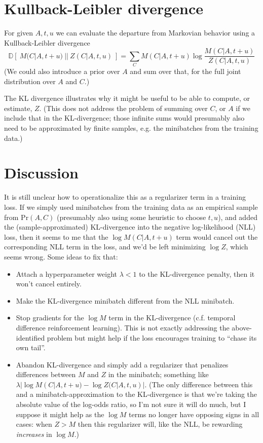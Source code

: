 \documentclass{article}
\newcommand\prob[1]{\mbox{Pr}\left( #1 \right)}
\newcommand\seclabel[1]{\label{sec:#1}}
\begin{document}
\section{Kullback-Leibler divergence}
\seclabel{KullbackLeibler}


For given $A,t,u$ we can evaluate the departure from Markovian behavior using a Kullback-Leibler divergence
\[
\mathbb{D}\left[\ M(C|A,t+u)\ ||\ Z(C|A,t,u)\ \right]
=
\sum_C M(C|A,t+u) \log
\frac{M(C|A,t+u)}{Z(C|A,t,u)}
\]
(We could also introduce a prior over $A$ and sum over that, for the full joint distribution over $A$ and $C$.)

The KL divergence illustrates why it might be useful to be able to compute, or estimate, $Z$.
(This does not address the problem of summing over $C$, or $A$ if we include that in the KL-divergence;
those infinite sums would presumably also need to be approximated by finite samples, e.g. the minibatches from the training data.)


\section{Discussion}
\seclabel{RegularizerDiscussion}

It is still unclear how to operationalize this as a regularizer term in a training loss.
If we simply used minibatches from the training data as an empirical sample from $\prob{A,C}$ (presumably also using some heuristic to choose $t,u$),
and added the (sample-approximated) KL-divergence into the negative log-likelihood (NLL) loss,
then it seems to me that the $\log M(C|A,t+u)$ term would cancel out the corresponding NLL term in the loss,
and we'd be left minimizing $\log Z$, which seems wrong.
Some ideas to fix that:
\begin{itemize}
    \item Attach a hyperparameter weight $\lambda < 1$ to the KL-divergence penalty, then it won't cancel entirely.
    \item Make the KL-divergence minibatch different from the NLL minibatch.
    \item Stop gradients for the $\log M$ term in the KL-divergence (c.f. temporal difference reinforcement learning). This is not exactly addressing the above-identified problem but might help if the loss encourages training to ``chase its own tail''.
    \item Abandon KL-divergence and simply add a regularizer that penalizes differences between $M$ and $Z$ in the minibatch; something like $\lambda | \log M(C|A,t+u) - \log Z(C|A,t,u) |$. (The only difference between this and a minibatch-approximation to the KL-divergence is that we're taking the absolute value of the log-odds ratio, so I'm not sure it will do much, but I suppose it might help as the $\log M$ terms no longer have opposing signs in all cases: when $Z>M$ then this regularizer will, like the NLL, be rewarding {\em increases} in $\log M$.)
\end{itemize}
\end{document}
